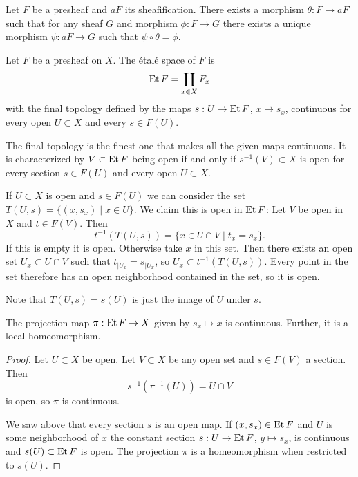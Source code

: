 \begin{prop}
Let $F$ be a presheaf and $aF$ its sheafification.
There exists a morphism $\theta : F \to aF$ such that for any sheaf $G$ and morphism $\phi : F \to G$ there exists a unique morphism $\psi : aF \to G$ such that $\psi \circ \theta = \phi$.
\end{prop}


\begin{defi}
Let $F$ be a presheaf on $X$.
The \'etal\'e space of $F$ is
\[
\operatorname{Et} F = \coprod_{x \in X} F_x
\]
with the final topology defined by the maps $s : U \to \operatorname{Et} F$, $x \mapsto s_x$, continuous for every open $U \subset X$ and every $s \in F(U)$.
\end{defi}

The final topology is the finest one that makes all the given maps continuous.
It is characterized by $V \subset \operatorname{Et} F$ being open if and only if $s^{-1}(V) \subset X$ is open for every section $s \in F(U)$ and every open $U \subset X$.

If $U \subset X$ is open and $s \in F(U)$ we can consider the set $T(U,s) = \{(x, s_x) \mid x \in U\}$.
We claim this is open in $\operatorname{Et} F$:
Let $V$ be open in $X$ and $t \in F(V)$.
Then
\[
t^{-1}(T(U,s))
= \{ x \in U \cap V \mid t_x = s_x \}.
\]
If this is empty it is open.
Otherwise take $x$ in this set.
Then there exists an open set $U_x \subset U \cap V$ such that $t_{|U_x} = s_{|U_x}$, so $U_x \subset t^{-1}(T(U,s))$.
Every point in the set therefore has an open neighborhood contained in the set, so it is open.

Note that $T(U,s) = s(U)$ is just the image of $U$ under $s$.


\begin{prop}
The projection map $\pi : \operatorname{Et} F \to X$ given by $s_x \mapsto x$ is continuous.
Further, it is a local homeomorphism.
\end{prop}

\begin{proof}
Let $U \subset X$ be open.
Let $V \subset X$ be any open set and $s \in F(V)$ a section.
Then
\[
s^{-1}(\pi^{-1}(U)) = U \cap V
\]
is open, so $\pi$ is continuous.

We saw above that every section $s$ is an open map.
If $(x, s_x) \in \operatorname{Et} F$ and $U$ is some neighborhood of $x$ the constant section $s : U \to \operatorname{Et} F$, $y \mapsto s_x$, is continuous and $s(U) \subset \operatorname{Et} F$ is open.
The projection $\pi$ is a homeomorphism when restricted to $s(U)$.
\end{proof}


